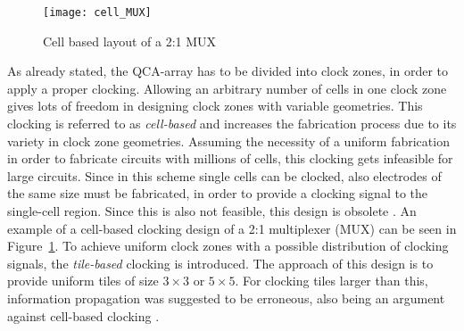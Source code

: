 \begin{figure}
	\centering
	\texttt{[image: cell\_MUX]}
	\caption{Cell based layout of a 2:1 MUX \cite{majeed2019optimal}}\label{fig:cell_based_mux}
\end{figure}

As already stated, the QCA-array has to be divided into clock zones, in order to apply a proper clocking. Allowing an arbitrary number of cells in one clock zone gives lots of freedom in designing clock zones with variable geometries. This clocking is referred to as \textit{cell-based} and increases the fabrication process due to its variety in clock zone geometries. Assuming the necessity of a uniform fabrication in order to fabricate circuits with millions of cells, this clocking gets infeasible for large circuits. Since in this scheme single cells can be clocked, also electrodes of the same size must be fabricated, in order to provide a clocking signal to the single-cell region. Since this is also not feasible, this design is obsolete \cite{blair2003architecture}. An example of a cell-based clocking design of a 2:1 multiplexer (MUX) can be seen in Figure~\ref{fig:cell_based_mux}. To achieve uniform clock zones with a possible distribution of clocking signals, the \textit{tile-based} clocking is introduced. The approach of this design is to provide uniform tiles of size $3 \times 3$ or $5 \times 5$. For clocking tiles larger than this, information propagation was suggested to be erroneous, also being an argument against cell-based clocking \cite{taucer2015consequences}.


